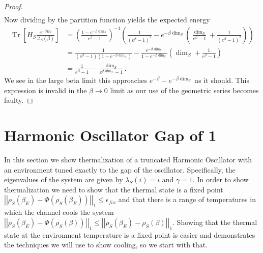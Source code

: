 \documentclass{article}
\newcommand{\parens}[1]{\left( #1 \right)}
\newcommand{\brackets}[1]{\left[ #1 \right]}
\newcommand{\norm}[1]{\left| \left| #1 \right| \right|}
\DeclareMathOperator{\Tr}{Tr}
\newcommand{\trace}[1]{\Tr \brackets{ #1 }}
\newcommand{\partfun}{\mathcal{Z}}
\begin{document}
\begin{proof}
\begin{align}
    \end{align}
    Now dividing by the partition function yields the expected energy
    \begin{align}
        \trace{H_S \frac{e^{-\beta H_S}}{\partfun_S(\beta )}} &= \left( \frac{1 - e^{-\beta \dim_S}}{e^{\beta} - 1} \right)^{-1} \parens{\frac{1}{(e^{\beta} - 1)^2} - e^{-\beta \dim_S} \parens{\frac{\dim_S}{e^{\beta} - 1} + \frac{1}{(e^{\beta} - 1)^2}}} \\
        &= \frac{1}{(e^{\beta} - 1)(1 - e^{-\beta \dim_S} )} - \frac{e^{-\beta \dim_S}}{1 - e^{-\beta \dim_S}} \parens{\dim_S + \frac{1}{e^{\beta} - 1}} \\
        &= \frac{1}{e^{\beta} - 1} - \frac{\dim_S}{e^{\beta \dim_S} - 1}.
    \end{align}
    We see in the large beta limit this approaches $e^{-\beta} - e^{-\beta \dim_S}$ as it should. This expression is invalid in the $\beta \to 0$ limit as our use of the geometric series becomes faulty. 
\end{proof}



\section{Harmonic Oscillator Gap of 1}

In this section we show thermalization of a truncated Harmonic Oscillator with an environment tuned exactly to the gap of the oscillator. Specifically, the eigenvalues of the system are given by $\lambda_S(i) = i$ and $\gamma = 1$. In order to show thermalization we need to show that the thermal state is a fixed point $\norm{\rho_S(\beta_E) - \Phi(\rho_S(\beta_E))}_1 \leq \epsilon_{fix}$ and that there is a range of temperatures in which the channel cools the system $\norm{\rho_S(\beta_E) - \Phi(\rho_S(\beta))}_1 \leq \norm{\rho_S(\beta_E) - \rho_S(\beta)}_1$. Showing that the thermal state at the environment temperature is a fixed point is easier and demonstrates the techniques we will use to show cooling, so we start with that.
\end{document}
